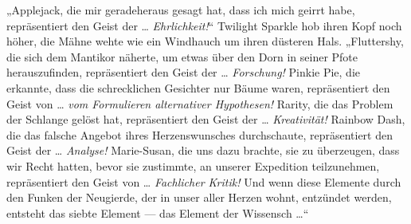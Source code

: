 „Applejack, die mir geradeheraus gesagt hat, dass ich mich geirrt habe, repräsentiert den Geist der … \emph{Ehrlichkeit!}“ Twilight Sparkle hob ihren Kopf noch höher, die Mähne wehte wie ein Windhauch um ihren düsteren Hals.
„Fluttershy, die sich dem Mantikor näherte, um etwas über den Dorn in seiner Pfote herauszufinden, repräsentiert den Geist der … \emph{Forschung!} Pinkie Pie, die erkannte, dass die schrecklichen Gesichter nur Bäume waren, repräsentiert den Geist von … \emph{vom Formulieren alternativer Hypothesen!} Rarity, die das Problem der Schlange gelöst hat, repräsentiert den Geist der … \emph{Kreativität!} Rainbow Dash, die das falsche Angebot ihres Herzenswunsches durchschaute, repräsentiert den Geist der … \emph{Analyse!} Marie-Susan, die uns dazu brachte, sie zu überzeugen, dass wir Recht hatten, bevor sie zustimmte, an unserer Expedition teilzunehmen, repräsentiert den Geist von … \emph{Fachlicher Kritik!} Und wenn diese Elemente durch den Funken der Neugierde, der in unser aller Herzen wohnt, entzündet werden, entsteht das siebte Element — das Element der Wissensch …“

